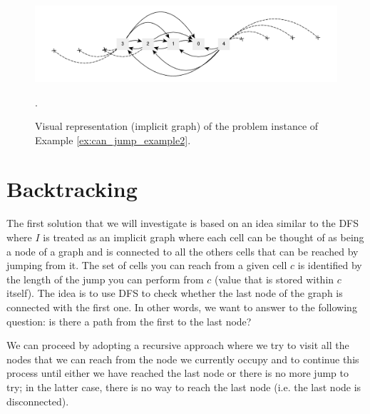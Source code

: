 \begin{figure}
    \centering
    \includegraphics[width=\textwidth]{sources/can_jump/images/example2}
    \caption[Implicit graph for the Example \ref{ex:can_jump_example2}.]
    {Visual representation (implicit graph) of the problem instance of Example
    \ref{ex:can_jump_example2}.}.
    \label{fig:can_jump:example2}
\end{figure}


    

\section{Backtracking}
\label{can_jump:sec:backtracking}
The first solution that we will investigate is based on an idea similar to the DFS where $I$
is treated as an implicit graph where each cell can be thought of as being a node of a graph and is connected to all the others cells that can be
reached by jumping from it.
The set of cells you can reach from a given cell $c$ is identified by
the length of the jump you can perform from $c$ (value that is stored within $c$ itself).
The idea is to use DFS to check whether the last node of the graph is connected with the first one.
In other words, we want to answer to the following question: is there a path from the first to the last node?

We can proceed by adopting a recursive approach where we try to visit all the nodes that we can reach from the node we currently
occupy and to continue this process until either we have reached the last node or there is no more
jump to try; in the latter case,  there is no way to reach the last node (i.e. the last node is
disconnected). 

